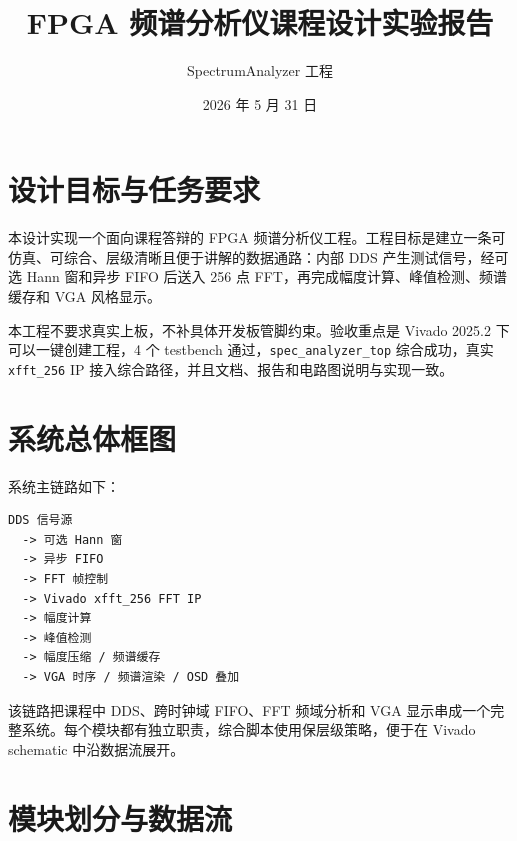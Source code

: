 \documentclass[UTF8,a4paper,12pt]{ctexart}
\title{FPGA 频谱分析仪课程设计实验报告}
\author{SpectrumAnalyzer 工程}
\date{2026 年 5 月 31 日}
\begin{document}
\maketitle

\section{设计目标与任务要求}

本设计实现一个面向课程答辩的 FPGA 频谱分析仪工程。工程目标是建立一条可仿真、可综合、层级清晰且便于讲解的数据通路：内部 DDS 产生测试信号，经可选 Hann 窗和异步 FIFO 后送入 256 点 FFT，再完成幅度计算、峰值检测、频谱缓存和 VGA 风格显示。

本工程不要求真实上板，不补具体开发板管脚约束。验收重点是 Vivado 2025.2 下可以一键创建工程，4 个 testbench 通过，\texttt{spec\_analyzer\_top} 综合成功，真实 \texttt{xfft\_256} IP 接入综合路径，并且文档、报告和电路图说明与实现一致。

\section{系统总体框图}

系统主链路如下：

\begin{verbatim}
DDS 信号源
  -> 可选 Hann 窗
  -> 异步 FIFO
  -> FFT 帧控制
  -> Vivado xfft_256 FFT IP
  -> 幅度计算
  -> 峰值检测
  -> 幅度压缩 / 频谱缓存
  -> VGA 时序 / 频谱渲染 / OSD 叠加
\end{verbatim}

该链路把课程中 DDS、跨时钟域 FIFO、FFT 频域分析和 VGA 显示串成一个完整系统。每个模块都有独立职责，综合脚本使用保层级策略，便于在 Vivado schematic 中沿数据流展开。

\section{模块划分与数据流}
\end{document}

